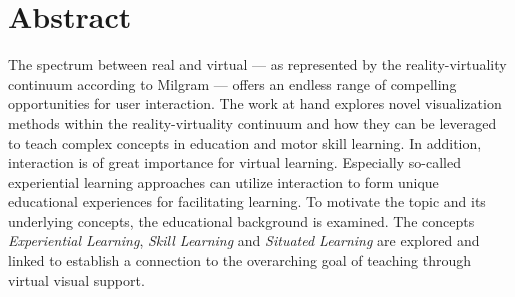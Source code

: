 %





\chapter*{Abstract}
\label{sec:abstract}
\vspace*{-10mm}

The spectrum between real and virtual --- as represented by the reality-virtuality continuum according to Milgram --- offers an endless range of compelling opportunities for user interaction.
The work at hand explores novel visualization methods within the reality-virtuality continuum and how they can be leveraged to teach complex concepts in education and motor skill learning.
In addition, interaction is of great importance for virtual learning.
Especially so-called experiential learning approaches can utilize interaction to form unique educational experiences for facilitating learning.
To motivate the topic and its underlying concepts, the educational background is examined.
The concepts \emph{Experiential Learning}, \emph{Skill Learning} and \emph{Situated Learning} are explored and linked to establish a connection to the overarching goal of teaching through virtual visual support.

